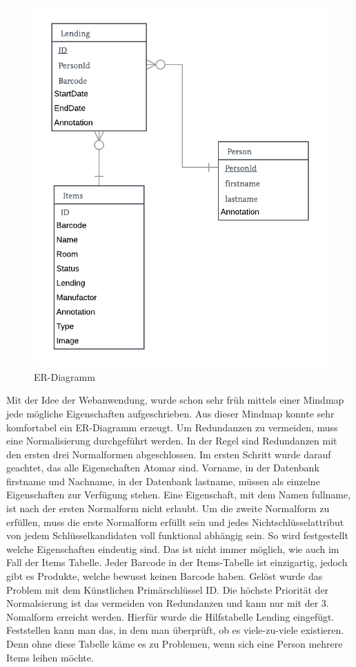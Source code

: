 \begin{figure}[bh]
	\centering
	\includegraphics[scale=0.35]{content/pictures/inventarER.png}
	\caption{ER-Diagramm}
	\label{fig:erdiagram}
\end{figure}

Mit der Idee der Webanwendung, wurde schon sehr früh mittels einer Mindmap jede mögliche Eigenschaften aufgeschrieben. Aus dieser Mindmap konnte sehr komfortabel ein ER-Diagramm erzeugt. Um Redundanzen zu vermeiden, muss eine Normalisierung durchgeführt werden. In der Regel sind Redundanzen mit den ersten drei Normalformen abgeschlossen. Im ersten Schritt wurde darauf geachtet, das alle Eigenschaften Atomar sind. Vorname, in der Datenbank firstname und Nachname, in der Datenbank lastname, müssen als einzelne Eigenschaften zur Verfügung stehen. Eine Eigenschaft, mit dem Namen fullname, ist nach der ersten Normalform nicht erlaubt. Um die zweite Normalform zu erfüllen, muss die erste Normalform erfüllt sein und jedes Nichtschlüsselattribut von jedem Schlüsselkandidaten voll funktional abhängig sein. So wird festgestellt welche Eigenschaften eindeutig sind. Das ist nicht immer möglich, wie auch im Fall der Items Tabelle. Jeder Barcode in der Items-Tabelle ist einzigartig, jedoch gibt es Produkte, welche bewusst keinen Barcode haben. Gelöst wurde das Problem mit dem Künstlichen Primärschlüssel ID.\autocite{DatenbankenVerstehen.2018b} Die höchste Priorität der Normalsierung ist das vermeiden von Redundanzen und kann nur mit der 3. Nomalform erreicht werden.  Hierfür wurde die Hilfstabelle Lending eingefügt. Feststellen kann man das, in dem man überprüft, ob es viele-zu-viele existieren. Denn ohne diese Tabelle käme es zu Problemen, wenn sich eine Person mehrere Items leihen möchte.\autocite{DatenbankenVerstehen.2018}


